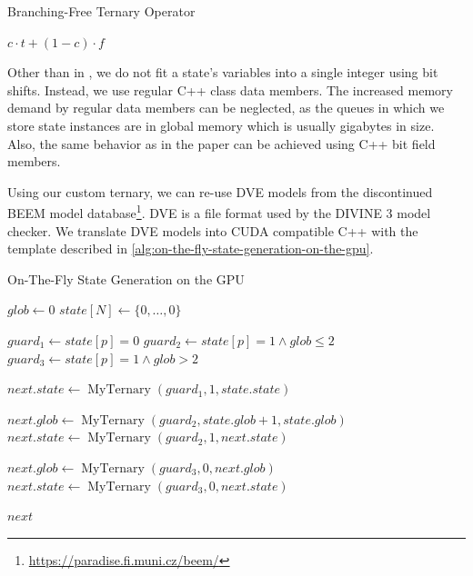 \documentclass[
fancyheadings, %
%
%
]{stsreprt}
\DeclareMathOperator{\sSuccessor}{state\_successor}
\begin{document}
\begin{algorithm}
    \caption{Branching-Free Ternary Operator}
    \label{alg:branching-free-ternary-operator}
    \begin{algorithmic}
        \State \Return $c \cdot t + (1 - c) \cdot f$
        \EndFunction
    \end{algorithmic}
\end{algorithm}

Other than in \cite{Bartocci2014.GPGPU-Parallel-SPIN}, we do not fit a state's variables into a single integer using bit shifts.
Instead, we use regular C++ class data members.
The increased memory demand by regular data members can be neglected, as the queues in which we store state instances are in global memory which is usually gigabytes in size.
Also, the same behavior as in the paper can be achieved using C++ bit field members.

Using our custom ternary, we can re-use DVE models from the discontinued BEEM model database\footnote{\url{https://paradise.fi.muni.cz/beem/}}.
DVE is a file format used by the DIVINE 3 model checker.
We translate DVE models into CUDA compatible C++ with the template described in \cref{alg:on-the-fly-state-generation-on-the-gpu}.


\begin{algorithm}
    \caption{On-The-Fly State Generation on the GPU}
    \label{alg:on-the-fly-state-generation-on-the-gpu}
    \begin{algorithmic}
        \State $glob \gets 0$
        \State $state[N] \gets \{0, \dots, 0\}$

        \Statex

        \Function{$\sSuccessor$}{p, ndc, state}
        \State $guard_1 \gets state[p] = 0$
        \State $guard_2 \gets state[p] = 1 \land glob \leq 2$
        \State $guard_3 \gets state[p] = 1 \land glob > 2$

        \State $next.state \gets \operatorname{MyTernary}(guard_1, 1, state.state)$

        \State $next.glob \gets \operatorname{MyTernary}(guard_2, state.glob + 1, state.glob)$
        \State $next.state \gets \operatorname{MyTernary}(guard_2, 1, next.state)$

        \State $next.glob \gets \operatorname{MyTernary}(guard_3, 0, next.glob)$
        \State $next.state \gets \operatorname{MyTernary}(guard_3, 0, next.state)$

        \Statex

        \State \Return $next$
        \EndFunction
    \end{algorithmic}
\end{algorithm}
\end{document}
